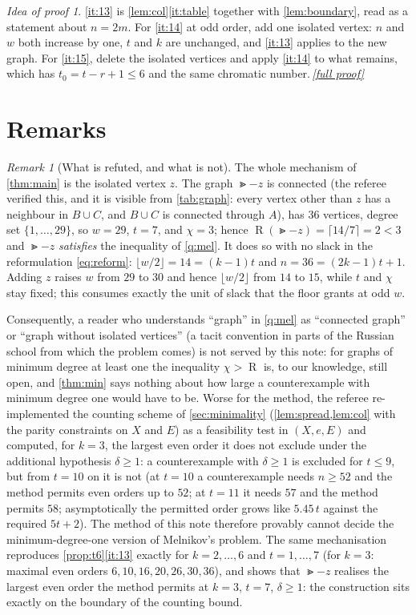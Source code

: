 \documentclass[11pt,a4paper]{article}
\theoremstyle{plain}
\theoremstyle{definition}
\theoremstyle{remark}
\newtheorem{remark}[theorem]{Remark}
\newtheorem*{proofidea}{Idea of proof}
\newcommand{\fullproofref}[1]{\,\hyperref[#1]{\textit{[full proof]}}}
\newcommand{\fl}[1]{\lfloor #1\rfloor}
\newcommand{\ce}[1]{\lceil #1\rceil}
\newcommand{\RHS}{\operatorname{R}}
\begin{document}
\begin{proofidea}
\ref{it:13} is \cref{lem:col}\ref{it:table} together with \cref{lem:boundary}, read as a statement about $n=2m$. For \ref{it:14} at odd order, add one isolated vertex: $n$ and $w$ both increase by one, $t$ and $k$ are unchanged, and \ref{it:13} applies to the new graph. For \ref{it:15}, delete the isolated vertices and apply \ref{it:14} to what remains, which has $t_0=t-r+1\le6$ and the same chromatic number.\fullproofref{pf:t6}
\end{proofidea}

\section{Remarks}\label{sec:remarks}

\begin{remark}[What is refuted, and what is not]\label{rem:scope}
The whole mechanism of \cref{thm:main} is the isolated vertex $z$. The graph $\Gt-z$ is connected (the referee verified this, and it is visible from \cref{tab:graph}: every vertex other than $z$ has a neighbour in $B\cup C$, and $B\cup C$ is connected through $A$), has $36$ vertices, degree set $\{1,\dots,29\}$, so $w=29$, $t=7$, and $\chi=3$; hence $\RHS(\Gt-z)=\ce{14/7}=2<3$ and $\Gt-z$ \emph{satisfies} the inequality of \cref{q:mel}. It does so with no slack in the reformulation \eqref{eq:reform}: $\fl{w/2}=14=(k-1)t$ and $n=36=(2k-1)t+1$. Adding $z$ raises $w$ from $29$ to $30$ and hence $\fl{w/2}$ from $14$ to $15$, while $t$ and $\chi$ stay fixed; this consumes exactly the unit of slack that the floor grants at odd $w$.

Consequently, a reader who understands ``graph'' in \cref{q:mel} as ``connected graph'' or ``graph without isolated vertices'' (a tacit convention in parts of the Russian school from which the problem comes) is not served by this note: for graphs of minimum degree at least one the inequality $\chi>\RHS$ is, to our knowledge, still open, and \cref{thm:min} says nothing about how large a counterexample with minimum degree one would have to be. Worse for the method, the referee re-implemented the counting scheme of \cref{sec:minimality} (\cref{lem:spread,lem:col} with the parity constraints on $X$ and $E$) as a feasibility test in $(X,e,E)$ and computed, for $k=3$, the largest even order it does not exclude under the additional hypothesis $\delta\ge1$: a counterexample with $\delta\ge1$ is excluded for $t\le9$, but from $t=10$ on it is not (at $t=10$ a counterexample needs $n\ge52$ and the method permits even orders up to $52$; at $t=11$ it needs $57$ and the method permits $58$; asymptotically the permitted order grows like $5.45\,t$ against the required $5t+2$). The method of this note therefore provably cannot decide the minimum-degree-one version of Melnikov's problem. The same mechanisation reproduces \cref{prop:t6}\ref{it:13} exactly for $k=2,\dots,6$ and $t=1,\dots,7$ (for $k=3$: maximal even orders $6,10,16,20,26,30,36$), and shows that $\Gt-z$ realises the largest even order the method permits at $k=3$, $t=7$, $\delta\ge1$: the construction sits exactly on the boundary of the counting bound.
\end{remark}
\end{document}
